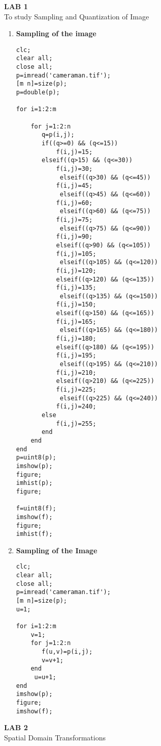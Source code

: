 \documentclass[12pt,a4paper]{report}
\begin{document}
\begin{center}
\Huge\textbf{LAB 1}\\
\large{To study Sampling and Quantization of Image
}
\end{center}
\vspace{1.0cm}
\begin{enumerate}
\item\textbf{Sampling of the image
}
\begin{verbatim}
clc;
clear all;
close all;
p=imread('cameraman.tif');
[m n]=size(p);
p=double(p);

for i=1:2:m
   
    for j=1:2:n
       q=p(i,j);
       if((q>=0) && (q<=15))
           f(i,j)=15;
       elseif((q>15) && (q<=30))
           f(i,j)=30;
            elseif((q>30) && (q<=45))
           f(i,j)=45;
            elseif((q>45) && (q<=60))
           f(i,j)=60;
            elseif((q>60) && (q<=75))
           f(i,j)=75;
            elseif((q>75) && (q<=90))
           f(i,j)=90;
           elseif((q>90) && (q<=105))
           f(i,j)=105;
            elseif((q>105) && (q<=120))
           f(i,j)=120;
           elseif((q>120) && (q<=135))
           f(i,j)=135;
            elseif((q>135) && (q<=150))
           f(i,j)=150;
           elseif((q>150) && (q<=165))
           f(i,j)=165;
            elseif((q>165) && (q<=180))
           f(i,j)=180;
           elseif((q>180) && (q<=195))
           f(i,j)=195;
            elseif((q>195) && (q<=210))
           f(i,j)=210;
           elseif((q>210) && (q<=225))
           f(i,j)=225;
            elseif((q>225) && (q<=240))
           f(i,j)=240;
       else
           f(i,j)=255;
       end
    end
end
p=uint8(p);
imshow(p);
figure;
imhist(p);
figure;

f=uint8(f);
imshow(f);
figure;
imhist(f);
\end{verbatim}\vspace{0.5cm}
\item\textbf{Sampling of the Image
}
\begin{verbatim}
clc;
clear all;
close all;
p=imread('cameraman.tif');
[m n]=size(p);
u=1;

for i=1:2:m
    v=1;
    for j=1:2:n
       f(u,v)=p(i,j);
       v=v+1;
    end
     u=u+1;
end
imshow(p);
figure;
imshow(f);
\end{verbatim}\vspace{0.5cm}

\end{enumerate}
\pagebreak\begin{center}
\Huge\textbf{LAB 2}\\
\large{Spatial Domain Transformations
}
\end{center}
\end{document}
